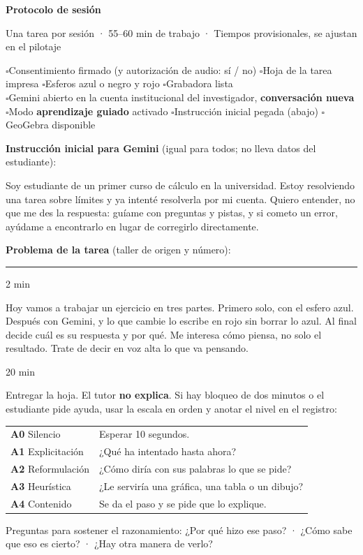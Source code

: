 \documentclass[10pt,letterpaper]{article}
\newcommand{\momento}[2]{\par\smallskip{\color{unalverde}\large\bfseries #1}\hfill{\small #2}\par\vspace{2pt}}
\newcommand{\cas}{$\square$\;}
\begin{document}
{\Large\bfseries Protocolo de sesión\par}
{\small Una tarea por sesión · 55--60 min de trabajo · Tiempos provisionales, se ajustan en el pilotaje\par}
\medskip

\begin{tcolorbox}[colback=grisclaro,colframe=unalverde,arc=2pt,title=\textbf{Antes de que llegue el estudiante (5 min)},fonttitle=\small]
\small
\cas Consentimiento firmado (y autorización de audio: sí / no) \quad
\cas Hoja de la tarea impresa \quad
\cas Esferos azul o negro y rojo \quad
\cas Grabadora lista \\
\cas Gemini abierto en la cuenta institucional del investigador, \textbf{conversación nueva} \quad
\cas Modo \textbf{aprendizaje guiado} activado \quad
\cas Instrucción inicial pegada (abajo) \quad
\cas GeoGebra disponible
\end{tcolorbox}

\textbf{Instrucción inicial para Gemini} (igual para todos; no lleva datos del estudiante):
\begin{guion}
Soy estudiante de un primer curso de cálculo en la universidad. Estoy resolviendo una tarea sobre límites y ya intenté resolverla por mi cuenta. Quiero entender, no que me des la respuesta: guíame con preguntas y pistas, y si cometo un error, ayúdame a encontrarlo en lugar de corregirlo directamente.
\end{guion}

\textbf{Problema de la tarea} (taller de origen y número): \rule{9cm}{0.4pt}

\momento{Apertura}{2 min}
\begin{guion}
Hoy vamos a trabajar un ejercicio en tres partes. Primero solo, con el esfero azul. Después con Gemini, y lo que cambie lo escribe en rojo sin borrar lo azul. Al final decide cuál es su respuesta y por qué. Me interesa cómo piensa, no solo el resultado. Trate de decir en voz alta lo que va pensando.
\end{guion}

\momento{Momento 1 --- Sin IA, esfero azul o negro}{20 min}
Entregar la hoja. El tutor \textbf{no explica}. Si hay bloqueo de dos minutos o el estudiante pide ayuda, usar la escala en orden y anotar el nivel en el registro:

\begin{center}\small
\begin{tabularx}{\linewidth}{@{}lL@{}}
\textbf{A0} Silencio & Esperar 10 segundos.\\
\textbf{A1} Explicitación & ¿Qué ha intentado hasta ahora?\\
\textbf{A2} Reformulación & ¿Cómo diría con sus palabras lo que se pide?\\
\textbf{A3} Heurística & ¿Le serviría una gráfica, una tabla o un dibujo?\\
\textbf{A4} Contenido & Se da el paso y se pide que lo explique.\\
\end{tabularx}
\end{center}
Preguntas para sostener el razonamiento: ¿Por qué hizo ese paso? · ¿Cómo sabe que eso es cierto? · ¿Hay otra manera de verlo?
\end{document}
